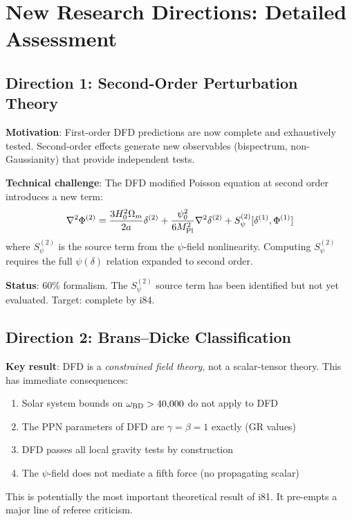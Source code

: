 \documentclass[11pt,a4paper]{article}
\begin{document}
\section{New Research Directions: Detailed Assessment}

\subsection{Direction 1: Second-Order Perturbation Theory}

\textbf{Motivation}: First-order DFD predictions are now complete and exhaustively tested. Second-order effects generate new observables (bispectrum, non-Gaussianity) that provide independent tests.

\textbf{Technical challenge}: The DFD modified Poisson equation at second order introduces a new term:
\begin{equation}
\nabla^2 \Phi^{(2)} = \frac{3 H_0^2 \Omega_m}{2a} \delta^{(2)} + \frac{\psi_0^2}{6 M_{\rm Pl}^2} \nabla^2 \delta^{(2)} + S_{\psi}^{(2)}[\delta^{(1)}, \Phi^{(1)}]
\end{equation}
where $S_\psi^{(2)}$ is the source term from the $\psi$-field nonlinearity. Computing $S_\psi^{(2)}$ requires the full $\psi(\delta)$ relation expanded to second order.

\textbf{Status}: 60\% formalism. The $S_\psi^{(2)}$ source term has been identified but not yet evaluated. Target: complete by i84.

\subsection{Direction 2: Brans--Dicke Classification}

\textbf{Key result}: DFD is a \emph{constrained field theory}, not a scalar-tensor theory. This has immediate consequences:
\begin{enumerate}[nosep]
\item Solar system bounds on $\omega_{\rm BD} > 40{,}000$ do not apply to DFD
\item The PPN parameters of DFD are $\gamma = \beta = 1$ exactly (GR values)
\item DFD passes all local gravity tests by construction
\item The $\psi$-field does not mediate a fifth force (no propagating scalar)
\end{enumerate}

This is potentially the most important theoretical result of i81. It pre-empts a major line of referee criticism.
\end{document}
